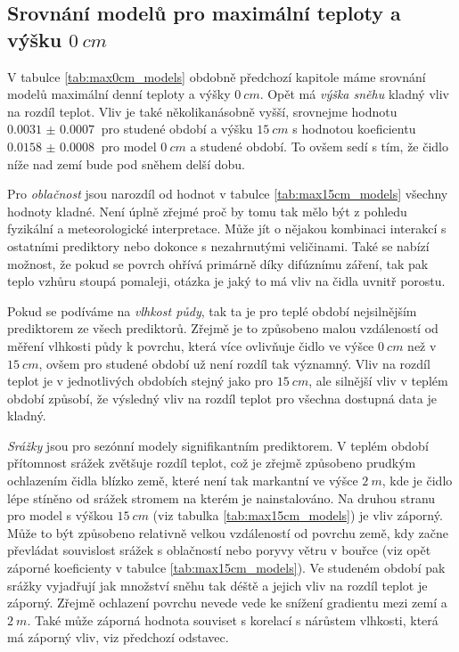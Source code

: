 \subsection{Srovnání modelů pro maximální teploty a výšku $\SI{0}{cm}$}
V tabulce \ref{tab:max0cm_models} obdobně předchozí kapitole máme srovnání modelů maximální denní teploty a výšky $\SI{0}{cm}$. Opět má \textit{výška sněhu} kladný vliv na rozdíl teplot. Vliv je také několikanásobně vyšší, srovnejme hodnotu $\SI{0.0031(7)}{}$ pro studené období a výšku $\SI{15}{cm}$ s hodnotou koeficientu $\SI{0.0158(8)}{}$ pro model $\SI{0}{cm}$ a studené období. To ovšem sedí s tím, že čidlo níže nad zemí bude pod sněhem delší dobu.

Pro \textit{oblačnost} jsou narozdíl od hodnot v tabulce \ref{tab:max15cm_models} všechny hodnoty kladné. Není úplně zřejmé proč by tomu tak mělo být z pohledu fyzikální a meteorologické interpretace. Může jít o nějakou kombinaci interakcí s ostatními prediktory nebo dokonce s nezahrnutými veličinami. Také se nabízí možnost, že pokud se povrch ohřívá primárně díky difúznímu záření, tak pak teplo vzhůru stoupá pomaleji, otázka je jaký to má vliv na čidla uvnitř porostu.

Pokud se podíváme na \textit{vlhkost půdy}, tak ta je pro teplé období nejsilnějším prediktorem ze všech prediktorů. Zřejmě je to způsobeno malou vzdáleností od měření vlhkosti půdy k povrchu, která více ovlivňuje čidlo ve výšce $\SI{0}{cm}$ než v $\SI{15}{cm}$, ovšem pro studené období už není rozdíl tak významný. Vliv na rozdíl teplot je v jednotlivých obdobích stejný jako pro $\SI{15}{cm}$, ale silnější vliv v teplém období způsobí, že výsledný vliv na rozdíl teplot pro všechna dostupná data je kladný.

\textit{Srážky} jsou pro sezónní modely signifikantním prediktorem. V teplém období přítomnost srážek zvětšuje rozdíl teplot, což je zřejmě způsobeno prudkým ochlazením čidla blízko země, které není tak markantní ve výšce $\SI{2}{m}$, kde je čidlo lépe stíněno od srážek stromem na kterém je nainstalováno. Na druhou stranu pro model s výškou $\SI{15}{cm}$ (viz tabulka \ref{tab:max15cm_models}) je vliv záporný. Může to být způsobeno relativně velkou vzdáleností od povrchu země, kdy začne převládat souvislost srážek s oblačností nebo poryvy větru v bouřce (viz opět záporné koeficienty v tabulce \ref{tab:max15cm_models}). Ve studeném období pak srážky vyjadřují jak množství sněhu tak déště a jejich vliv na rozdíl teplot je záporný. Zřejmě ochlazení povrchu nevede vede ke snížení gradientu mezi zemí a $\SI{2}{m}$. Také může záporná hodnota souviset s korelací s nárůstem vlhkosti, která má záporný vliv, viz předchozí odstavec.

